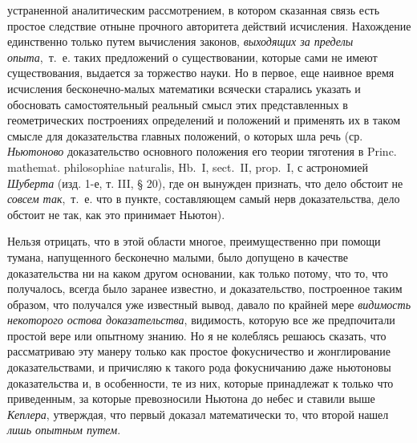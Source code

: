 устраненной аналитическим рассмотрением, в котором сказанная связь есть
простое следствие отныне прочного авторитета действий исчисления.
Нахождение единственно только путем вычисления законов,
{\em выходящих за пределы опыта},~т.~е. таких
предложений о существовании, которые сами не имеют существования, выдается
за торжество науки. Но в первое, еще наивное время исчисления
бесконечно-малых математики всячески старались указать и обосновать
самостоятельный реальный смысл этих представленных в геометрических
построениях определений и положений и применять их в таком смысле для
доказательства главных положений, о которых шла речь (ср.
{\em Ньютоново} доказательство основного положения его
теории тяготения в Princ. mathemat. philosophiae naturalis, Hb.~I,
sect.~II, prop.~I, с астрономией {\em Шуберта} (изд. 1-е, т. III, § 20),
где он вынужден признать, что дело обстоит не
{\em совсем так},~т.~е. что в пункте, составляющем
самый нерв доказательства, дело обстоит не так, как это принимает Ньютон).

Нельзя отрицать, что в этой области многое, преимущественно при помощи
тумана, напущенного бесконечно малыми, было допущено в качестве
доказательства ни на каком другом основании, как только потому, что то, что
получалось, всегда было заранее известно, и доказательство, построенное
таким образом, что получался уже известный вывод, давало по крайней мере
{\em видимость некоторого остова доказательства},
видимость, которую все же предпочитали простой вере или опытному знанию. Но
я не колеблясь решаюсь сказать, что рассматриваю эту манеру только как
простое фокусничество и жонглирование доказательствами, и причисляю к
такого рода фокусничанию даже ньютоновы доказательства и, в особенности, те
из них, которые принадлежат к только что приведенным, за которые
превозносили Ньютона до небес и ставили выше
{\em Кеплера}, утверждая, что первый доказал
математически то, что второй нашел {\em лишь опытным
путем}.

